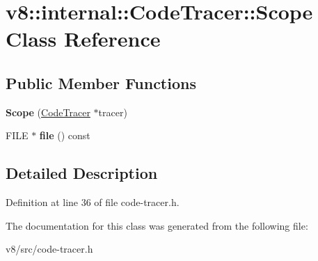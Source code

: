 \hypertarget{classv8_1_1internal_1_1CodeTracer_1_1Scope}{}\section{v8\+:\+:internal\+:\+:Code\+Tracer\+:\+:Scope Class Reference}
\label{classv8_1_1internal_1_1CodeTracer_1_1Scope}
\subsection*{Public Member Functions}
\begin{DoxyCompactItemize}
\item 
\mbox{\label{classv8_1_1internal_1_1CodeTracer_1_1Scope_a0475ce5cee4a4d97d8854ae01cad9e6e}} 
{\bfseries Scope} (\mbox{\hyperlink{classv8_1_1internal_1_1CodeTracer}{Code\+Tracer}} $\ast$tracer)
\item 
\mbox{\label{classv8_1_1internal_1_1CodeTracer_1_1Scope_a4f1a752749f50601908ffd35050903ae}} 
F\+I\+LE $\ast$ {\bfseries file} () const
\end{DoxyCompactItemize}


\subsection{Detailed Description}


Definition at line 36 of file code-\/tracer.\+h.



The documentation for this class was generated from the following file\+:\begin{DoxyCompactItemize}
\item 
v8/src/code-\/tracer.\+h\end{DoxyCompactItemize}
